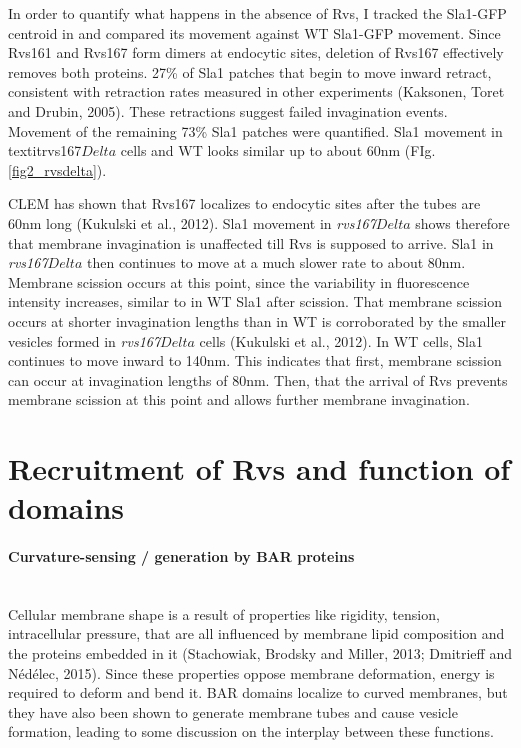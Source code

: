 In order to quantify what happens in the absence of Rvs, I tracked the Sla1-GFP centroid in and compared its movement against WT Sla1-GFP movement. Since Rvs161 and Rvs167 form dimers at endocytic sites, deletion of Rvs167 effectively removes both proteins. 27\% of Sla1 patches that begin to move inward retract, consistent with retraction rates measured in other experiments (Kaksonen, Toret and Drubin, 2005). These retractions suggest failed invagination events. Movement of the remaining 73\% Sla1 patches were quantified. Sla1 movement in textit{rvs167$Delta$} cells and WT looks similar up to about 60nm (FIg.\ref{fig2_rvsdelta}). 

\vspace{5mm}
CLEM has shown that Rvs167 localizes to endocytic sites after the tubes are 60nm long (Kukulski et al., 2012). Sla1 movement in \textit{rvs167$Delta$} shows therefore that membrane invagination is unaffected till Rvs is supposed to arrive. Sla1 in \textit{rvs167$Delta$} then continues to move at a much slower rate to about 80nm. Membrane scission occurs at this point, since the variability in fluorescence intensity increases, similar to in WT Sla1 after scission. That membrane scission occurs at shorter invagination lengths than in WT is corroborated by the smaller vesicles formed in \textit{rvs167$Delta$} cells (Kukulski et al., 2012). In WT cells, Sla1 continues to move inward to 140nm. This indicates that first, membrane scission can occur at invagination lengths of 80nm. Then, that the arrival of Rvs prevents membrane scission at this point and allows further membrane invagination. 





\section{Recruitment of Rvs and function of domains} 

	\paragraph{Curvature-sensing / generation by BAR proteins }
					\mbox{}\\
Cellular membrane shape is a result of properties like rigidity, tension, intracellular pressure, that are all influenced by membrane lipid composition and the proteins embedded in it (Stachowiak, Brodsky and Miller, 2013; Dmitrieff and Nédélec, 2015). Since these properties oppose membrane deformation, energy is required to deform and bend it. BAR domains localize to curved membranes, but they have also been shown to generate membrane tubes and cause vesicle formation, leading to some discussion on the interplay between these functions. 


